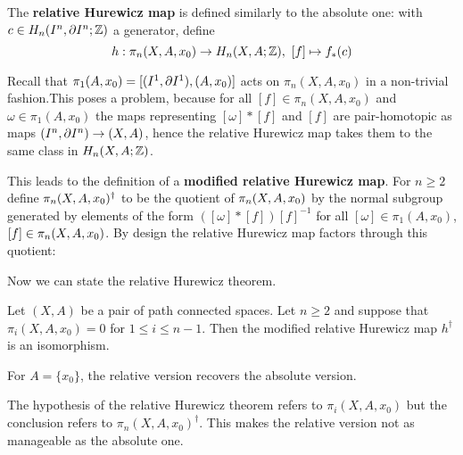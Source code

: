 The \textbf{relative Hurewicz map} is defined similarly to the absolute one: with $c\in H_n(I^n,\partial I^n;{\mathbb Z})$ a generator, define
\[h:\pi_n(X,A,x_0)\to H_n(X,A;{\mathbb Z}),\ [f]\mapsto f_*(c)\]


Recall that $\pi_1(A,x_0)=[(I^1,\partial I^1),(A,x_0)]$ acts on $\pi_n(X,A,x_0)$ in a non-trivial fashion.\alvaropls This poses a problem, because for all $[f]\in\pi_n(X,A,x_0)$ and $\omega\in\pi_1(A,x_0)$ the maps representing $[\omega]*[f]$ and $[f]$ are pair-homotopic as maps $(I^n,\partial I^n)\to(X,A)$, hence the relative Hurewicz map takes them to the same class in $H_n(X,A;{\mathbb Z})$.

This leads to the definition of a \textbf{modified relative Hurewicz map}. For $n\geq2$ define $\pi_n(X,A,x_0)^\dagger$ to be the quotient of $\pi_n(X,A,x_0)$ by the normal subgroup generated by elements of the form $([\omega]*[f])[f]^{-1}$ for all $[\omega]\in\pi_1(A,x_0)$, $[f]\in\pi_n(X,A,x_0)$. By design the relative Hurewicz map factors through this quotient:
\begin{center}
\end{center}

Now we can state the relative Hurewicz theorem.

\begin{theorem}[Hurewicz]\label{theorem:hurewicz}
Let $(X,A)$ be a pair of path connected spaces. Let $n\geq2$ and suppose that $\pi_i(X,A,x_0)=0$ for $1\leq i\leq n-1$. Then the modified relative Hurewicz map $h^\dagger$ is an isomorphism.
\end{theorem}

\begin{remark}
For $A=\{x_0\}$, the relative version recovers the absolute version.
\end{remark}

\begin{remark}
The hypothesis of the relative Hurewicz theorem refers to $\pi_i(X,A,x_0)$ but the conclusion refers to $\pi_n(X,A,x_0)^\dagger$. This makes the relative version not as manageable as the absolute one.
\end{remark}